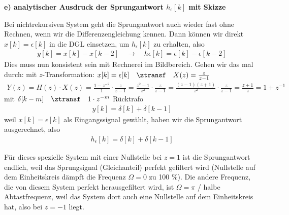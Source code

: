\begin{Loesung}
\textbf{e) analytischer Ausdruck der Sprungantwort $h_\epsilon[k]$ mit Skizze}
%

Bei nichtrekursiven System geht die Sprungantwort auch wieder fast ohne Rechnen,
wenn wir die Differenzengleichung kennen. Dann können wir direkt
$x[k] = \epsilon[k]$ in die DGL einsetzen, um $h_\epsilon[k]$ zu erhalten, also
\begin{align}
y[k] = x[k] - x[k-2]
\quad\rightarrow\quad
h\epsilon[k] = \epsilon[k] - \epsilon[k-2]
\end{align}
Dies muss nun konsistent sein mit Rechnerei im Bildbereich. Gehen wir das mal durch:
%
mit $z$-Transformation: $x[k] = \epsilon[k] \quad\ztransf\quad X(z) = \frac{z}{z-1}$
%
\begin{align}
\label{eq:F0EF9C3FA6_Hz_Sprung}
Y(z) = H(z) \cdot X(z) = \frac{1-z^{-2}}{1} \cdot \frac{z}{z-1} =
 \frac{z^2-1}{z^2} \cdot \frac{z}{z-1} =
\frac{(z-1)(z+1)}{z^2} \cdot \frac{z}{z-1} =
\frac{z+1}{z} = 1 + z^{-1}
\end{align}
%
mit $\delta[k-m]  \quad\ztransf\quad 1 \cdot z^{-m}$ Rücktrafo
%
\begin{align}
y[k] = \delta[k] + \delta[k-1]
\end{align}
%
weil $x[k] = \epsilon[k]$ als Eingangssignal gewählt, haben wir die Sprungantwort
ausgerechnet, also
%
\begin{align}
h_\epsilon[k] = \delta[k] + \delta[k-1]
\end{align}
%
\begin{center}
\end{center}

Für dieses spezielle System mit einer Nullstelle bei $z=1$ ist die Sprungantwort endlich,
weil das Sprungsignal (Gleichanteil) perfekt gefiltert wird (Nullstelle auf dem
Einheitskreis dämpft die Frequenz $\Omega=0$ zu 100 \%).
%
Die andere Frequenz, die von diesem System perfekt herausgefiltert wird, ist
$\Omega=\pi$ / halbe Abtastfrequenz, weil das System dort auch eine Nullstelle auf dem Einheitskreis hat,
also bei $z=-1$ liegt.


\end{Loesung}
